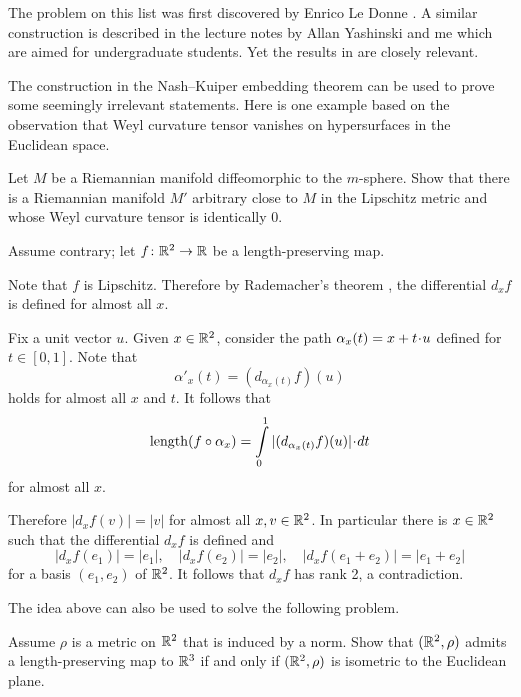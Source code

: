The problem
on this list was first discovered by Enrico Le Donne \cite[see][]{le-donne}.
A similar construction is described in the lecture notes by Allan Yashinski and me \cite[see][]{petrunin-yashinsky} 
which are aimed for undergraduate students. 
Yet the results in \cite{petrunin-paths} are closely relevant.

The construction in the Nash--Kuiper embedding theorem
can be used to prove some seemingly irrelevant statements.
Here is one example based on the observation that Weyl curvature tensor 
vanishes on hypersurfaces in the Euclidean space.

\begin{pr}
Let $M$ be a Riemannian manifold diffeomorphic to the $m$-sphere. 
Show that there is a Riemannian manifold $M'$ arbitrary close to $M$ in the Lipschitz metric and whose Weyl curvature tensor is identically 0.
\end{pr}

Assume contrary;
let $f\colon\mathbb{R}^2\to \mathbb{R}$ be a length-preserving map.

Note that $f$ is Lipschitz.
Therefore by Rademacher's theorem \cite[see][]{rademacher}, the differential $d_xf$ is defined for  almost all $x$.

Fix a unit vector $u$.
Given $x\in\mathbb{R}^2$,
consider the path $\alpha_x(t)\z=x+t\cdot u$ defined for $t\in [0,1]$.
Note that  
\[\alpha'_x(t)=(d_{\alpha_x(t)}f)(u)\]
holds for almost all $x$ and $t$.
It follows that 
\[\length(f\circ\alpha_x)=\int\limits_0^1 |(d_{\alpha_x(t)}f)(u)| \cdot dt\]
for almost all $x$.

Therefore $|d_xf(v)|=|v|$ for almost all $x,v\in\mathbb{R}^2$.
In particular there is $x\in\mathbb{R}^2$ such that the differential $d_xf$ is defined 
and 
\[|d_xf(e_1)|=|e_1|,
\quad
|d_xf(e_2)|=|e_2|,
\quad
|d_xf(e_1+e_2)|=|e_1+e_2|\]
for a basis $(e_1,e_2)$ of $\mathbb{R}^2$.
It follows that $d_xf$ has rank 2, a contradiction. \qeds 


The idea above can also be used to solve the following problem.

\begin{pr} Assume $\rho$ is a metric on $\mathbb{R}^2$ that is induced by a norm.
Show that $(\mathbb{R}^2,\rho)$ admits 
a length-preserving map
to $\mathbb{R}^3$ 
if and only if 
$(\mathbb{R}^2,\rho)$ is isometric to the Euclidean plane.
\end{pr}








